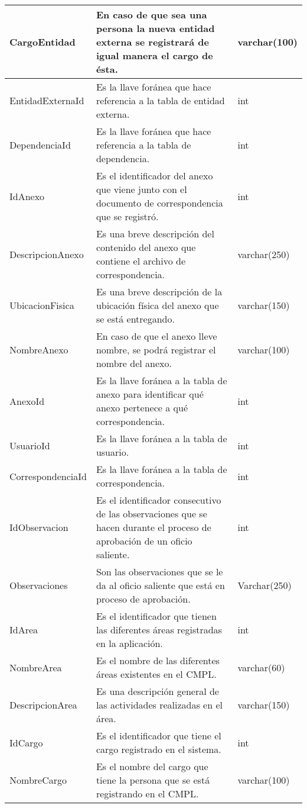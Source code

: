 \begin{table}[htbp!]
\begin{center}
\begin{tabular}{|l|l|l|}
			CargoEntidad & En caso de que sea una persona la nueva entidad externa se registrará de igual manera el cargo de ésta. & varchar(100) \\\hline
			EntidadExternaId & Es la llave foránea que hace referencia a la tabla de entidad externa. & int \\\hline
			DependenciaId & Es la llave foránea que hace referencia a la tabla de dependencia. & int\\\hline
			IdAnexo & Es el identificador del anexo que viene junto con el documento de correspondencia que se registró. & int\\\hline
			DescripcionAnexo & Es una breve descripción del contenido del anexo que contiene el archivo de correspondencia. & varchar(250)\\\hline
			UbicacionFisica & Es una breve descripción de la ubicación física del anexo que se está entregando. & varchar(150)\\\hline
			NombreAnexo & En caso de que el anexo lleve nombre, se podrá registrar el nombre del anexo. & varchar(100)\\\hline
			AnexoId & Es la llave foránea a la tabla de anexo para identificar qué anexo pertenece a qué correspondencia. & int\\\hline
			UsuarioId & Es la llave foránea a la tabla de usuario. & int\\\hline
			CorrespondenciaId & Es la llave foránea a la tabla de correspondencia. & int\\\hline
			IdObservacion & Es el identificador consecutivo de las observaciones que se hacen durante el proceso de aprobación de un oficio saliente. & int\\\hline 
			Observaciones & Son las observaciones que se le da al oficio saliente que está en proceso de aprobación. & Varchar(250)\\\hline
			IdArea & Es el identificador que tienen las diferentes áreas registradas en la aplicación. & int\\\hline
			NombreArea & Es el nombre de las diferentes áreas existentes en el CMPL. & varchar(60)\\\hline
			DescripcionArea & Es una descripción general de las actividades realizadas en el área. & varchar(150)\\\hline
			IdCargo & Es el identificador que tiene el cargo registrado en el sistema. & int \\\hline
			NombreCargo & Es el nombre del cargo que tiene la persona que se está registrando en el CMPL. & varchar(100)\\\hline

\end{tabular}
\end{center}
\end{table}
